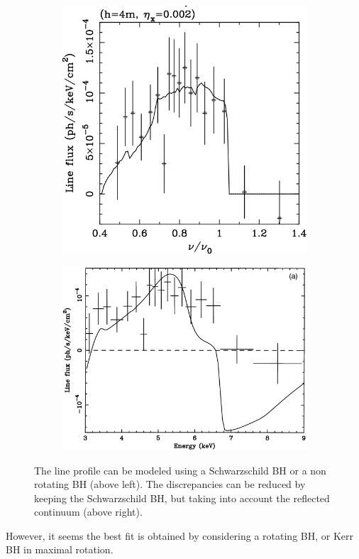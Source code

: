 \documentclass[10pt,a4paper,english]{article}
\begin{document}
\begin{figure}[!ht]
  \begin{subfigure}[t]{0.495\textwidth}
    \includegraphics{figures/reynolds1997.png}
    \caption{\cite{Reynolds1997}}
  \end{subfigure}
  \begin{subfigure}[t]{0.495\textwidth}
    \includegraphics{figures/young-1.png}
    \caption{\cite{Young1998}}
  \end{subfigure}
  \caption{The line profile can be modeled using a Schwarzschild BH or a non rotating BH
(above left). The discrepancies can be reduced by keeping the Schwarzschild BH,
but taking into account the reflected continuum (above right).}
\end{figure}
However, it seems the best fit is obtained by considering a rotating BH, or
Kerr BH in maximal rotation.
\end{document}
